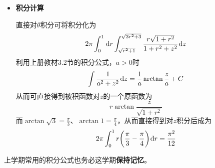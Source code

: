\documentclass[a4paper,UTF8,fontset=windows,AutoFakeBold]{ctexart}
\newcommand*{\dr}{\hspace{0.07em}\mathrm{d}}
\newcommand*{\note}{\noindent *}
\theoremstyle{ex}
\begin{document}
\begin{framed}
{\begin{itemize}
        \item \textbf{积分计算}

        直接对$\theta$积分可将积分化为
        $$2\pi\int_0^1\dr r\int_{\sqrt{r^2+1}}^{\sqrt{3r^2+3}}\frac{r\sqrt{1+r^2}}{1+r^2+z^2}\dr z$$
        利用上册教材3.2节的积分公式，$a>0$时
        $$\int\frac{1}{a^2+z^2}\dr z=\frac{1}{a}\arctan\frac{z}{a}+C$$
        从而可直接得到被积函数对$z$的一个原函数为
        $$r\arctan\frac{z}{\sqrt{1+r^2}}$$
        而$\arctan\sqrt3=\frac{\pi}{3}$、$\arctan1=\frac{\pi}{4}$，从而直接得到对$z$积分后成为
        $$2\pi\int_0^1r\bigg(\frac{\pi}{3}-\frac{\pi}{4}\bigg)\dr r=\frac{\pi^2}{12}$$
    \end{itemize}

    \note 上学期常用的积分公式也务必这学期\textbf{保持记忆}。
}
\end{framed}
\end{document}
